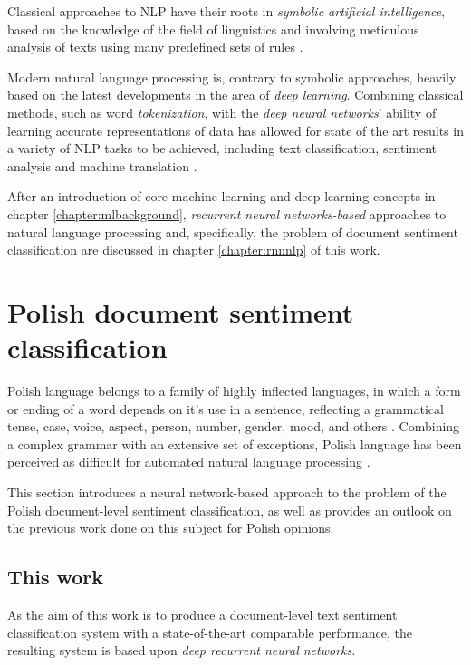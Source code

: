 Classical approaches to NLP have their roots in \emph{symbolic artificial intelligence}, based on the knowledge of the field of linguistics and involving meticulous analysis of texts using many predefined sets of rules \cite{handbook_nlp}. 

Modern natural language processing is, contrary to symbolic approaches, heavily based on the latest developments in the area of \emph{deep learning}. Combining classical methods, such as word \emph{tokenization}, with the \emph{deep neural networks}' ability of learning accurate representations of data has allowed for state of the art results in a variety of NLP tasks to be achieved, including text classification, sentiment analysis and machine translation \cite{ulmfit,languagemodels:vstranslation,goodfellow,pan:sentimentanalysis,zhou:sentimentcnn}.

After an introduction of core machine learning and deep learning concepts in chapter \ref{chapter:mlbackground}, \emph{recurrent neural networks-based} approaches to natural language processing and, specifically, the problem of document sentiment classification are discussed in chapter \ref{chapter:rnnnlp} of this work.

\section{Polish document sentiment classification}
\label{sentiment:polish}

Polish language belongs to a family of highly inflected languages, in which a form or ending of a word depends on it's use in a sentence, reflecting a grammatical tense, case, voice, aspect, person, number, gender, mood, and others \cite{wiki:inflection}. Combining a complex grammar with an extensive set of exceptions, Polish language has been perceived as difficult for automated natural language processing \cite{polish:difficult,polishdiff,polishdiff_grammar}.


This section introduces a neural network-based approach to the problem of the Polish document-level sentiment classification, as well as provides an outlook on the previous work done on this subject for Polish opinions.

\subsection{This work}

As the aim of this work is to produce a document-level text sentiment classification system with a state-of-the-art comparable performance, the resulting system is based upon \emph{deep recurrent neural networks}.

